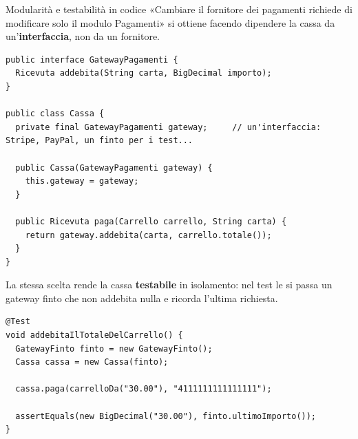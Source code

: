 
\begin{esempio}{Modularità e testabilità in codice}
«Cambiare il fornitore dei pagamenti richiede di modificare solo il modulo Pagamenti» si ottiene facendo dipendere la
cassa da un'\textbf{interfaccia}, non da un fornitore.
\begin{lstlisting}[style=java, name=Cassa.java]
public interface GatewayPagamenti {
  Ricevuta addebita(String carta, BigDecimal importo);
}

public class Cassa {
  private final GatewayPagamenti gateway;     // un'interfaccia: Stripe, PayPal, un finto per i test...

  public Cassa(GatewayPagamenti gateway) {
    this.gateway = gateway;
  }

  public Ricevuta paga(Carrello carrello, String carta) {
    return gateway.addebita(carta, carrello.totale());
  }
}
\end{lstlisting}
La stessa scelta rende la cassa \textbf{testabile} in isolamento: nel test le si passa un gateway finto che non addebita
nulla e ricorda l'ultima richiesta.
\begin{lstlisting}[style=java, name=CassaTest.java]
@Test
void addebitaIlTotaleDelCarrello() {
  GatewayFinto finto = new GatewayFinto();
  Cassa cassa = new Cassa(finto);

  cassa.paga(carrelloDa("30.00"), "4111111111111111");

  assertEquals(new BigDecimal("30.00"), finto.ultimoImporto());
}
\end{lstlisting}
\end{esempio}



